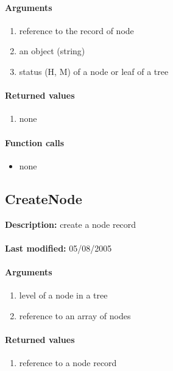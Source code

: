 \paragraph{Arguments}
\begin{enumerate}
\item reference to the record of node
\item an object (string)
\item status (H, M) of a node or leaf of a tree
\end{enumerate}

\paragraph{Returned values}
\begin{enumerate}
\item none
\end{enumerate}

\paragraph{Function calls}
\begin{itemize}
\item none
\end{itemize}

\subsection{CreateNode}
\textbf{Description:} create a node record\\
\\\textbf{Last modified:} 05/08/2005

\paragraph{Arguments}
\begin{enumerate}
\item level of a node in a tree
\item reference to an array of nodes
\end{enumerate}

\paragraph{Returned values}
\begin{enumerate}
\item reference to a node record
\end{enumerate}

